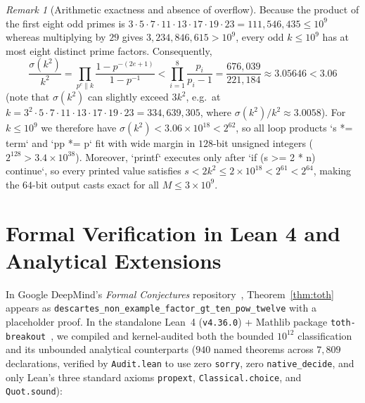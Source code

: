 \documentclass[11pt]{amsart}
\theoremstyle{definition}
\theoremstyle{remark}
\newtheorem{remark}[theorem]{Remark}
\begin{document}
\begin{remark}[Arithmetic exactness and absence of overflow]\label{rem:overflow}
Because the product of the first eight odd primes is $3 \cdot 5 \cdot 7 \cdot 11 \cdot 13 \cdot 17 \cdot 19 \cdot 23 = 111{,}546{,}435 \le 10^9$ whereas multiplying by $29$ gives $3{,}234{,}846{,}615 > 10^9$, every odd $k \le 10^9$ has at most eight distinct prime factors. Consequently,
\[
  \frac{\sigma(k^2)}{k^2} = \prod_{p^e \parallel k} \frac{1 - p^{-(2e+1)}}{1 - p^{-1}} < \prod_{i=1}^{8} \frac{p_i}{p_i - 1} = \frac{676{,}039}{221{,}184} \approx 3.05646 < 3.06
\]
(note that $\sigma(k^2)$ can slightly exceed $3k^2$, e.g.\ at $k = 3^2 \cdot 5 \cdot 7 \cdot 11 \cdot 13 \cdot 17 \cdot 19 \cdot 23 = 334{,}639{,}305$, where $\sigma(k^2)/k^2 \approx 3.0058$). For $k \le 10^9$ we therefore have $\sigma(k^2) < 3.06 \times 10^{18} < 2^{62}$, so all loop products `s *= term` and `pp *= p` fit with wide margin in $128$-bit unsigned integers ($2^{128} > 3.4 \times 10^{38}$). Moreover, `printf` executes only after `if (s >= 2 * n) continue`, so every printed value satisfies $s < 2k^2 \le 2 \times 10^{18} < 2^{61} < 2^{64}$, making the $64$-bit output casts exact for all $M \le 3 \times 10^9$.
\end{remark}

\section{Formal Verification in Lean 4 and Analytical Extensions}

In Google DeepMind's \emph{Formal Conjectures} repository~\cite{FormalConjectures}, Theorem~\ref{thm:toth} appears as \texttt{descartes\_non\_example\_factor\_gt\_ten\_pow\_twelve} with a placeholder proof. In the standalone Lean~4 (\texttt{v4.36.0}) + Mathlib package \texttt{toth-breakout}~\cite{HamiltonRepo}, we compiled and kernel-audited both the bounded $10^{12}$ classification and its unbounded analytical counterparts ($940$ named theorems across $7{,}809$ declarations, verified by \texttt{Audit.lean} to use zero \texttt{sorry}, zero \texttt{native\_decide}, and only Lean's three standard axioms \texttt{propext}, \texttt{Classical.choice}, and \texttt{Quot.sound}):
\end{document}
